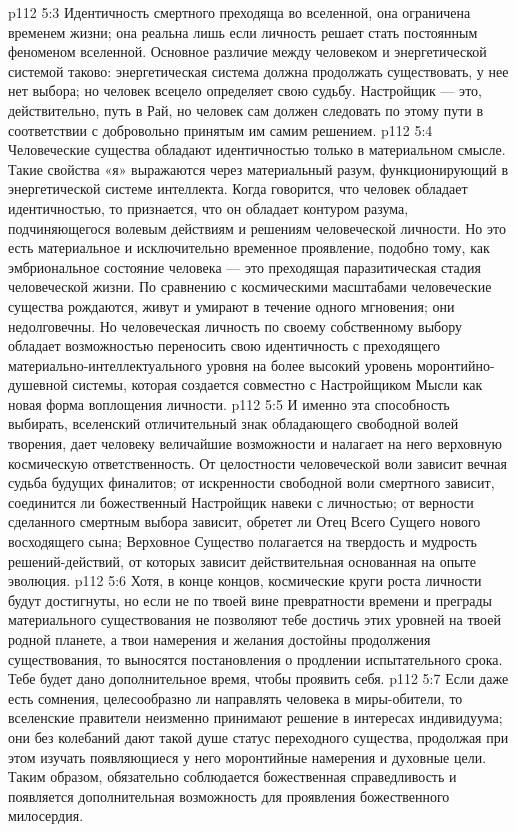 \vs p112 5:3 \pc Идентичность смертного преходяща во вселенной, она ограничена временем жизни; она реальна лишь если личность решает стать постоянным феноменом вселенной. Основное различие между человеком и энергетической системой таково: энергетическая система должна продолжать существовать, у нее нет выбора; но человек всецело определяет свою судьбу. Настройщик --- это, действительно, путь в Рай, но человек сам должен следовать по этому пути в соответствии с добровольно принятым им самим решением.
\vs p112 5:4 Человеческие существа обладают идентичностью только в материальном смысле. Такие свойства «я» выражаются через материальный разум, функционирующий в энергетической системе интеллекта. Когда говорится, что человек обладает идентичностью, то признается, что он обладает контуром разума, подчиняющегося волевым действиям и решениям человеческой личности. Но это есть материальное и исключительно временное проявление, подобно тому, как эмбриональное состояние человека --- это преходящая паразитическая стадия человеческой жизни. По сравнению с космическими масштабами человеческие существа рождаются, живут и умирают в течение одного мгновения; они недолговечны. Но человеческая личность по своему собственному выбору обладает возможностью переносить свою идентичность с преходящего материально\hyp{}интеллектуального уровня на более высокий уровень моронтийно\hyp{}душевной системы, которая создается совместно с Настройщиком Мысли как новая форма воплощения личности.
\vs p112 5:5 И именно эта способность выбирать, вселенский отличительный знак обладающего свободной волей творения, дает человеку величайшие возможности и налагает на него верховную космическую ответственность. От целостности человеческой воли зависит вечная судьба будущих финалитов; от искренности свободной воли смертного зависит, соединится ли божественный Настройщик навеки с личностью; от верности сделанного смертным выбора зависит, обретет ли Отец Всего Сущего нового восходящего сына; Верховное Существо полагается на твердость и мудрость решений\hyp{}действий, от которых зависит действительная основанная на опыте эволюция.
\vs p112 5:6 \pc Хотя, в конце концов, космические круги роста личности будут достигнуты, но если не по твоей вине превратности времени и преграды материального существования не позволяют тебе достичь этих уровней на твоей родной планете, а твои намерения и желания достойны продолжения существования, то выносятся постановления о продлении испытательного срока. Тебе будет дано дополнительное время, чтобы проявить себя.
\vs p112 5:7 Если даже есть сомнения, целесообразно ли направлять человека в миры\hyp{}обители, то вселенские правители неизменно принимают решение в интересах индивидуума; они без колебаний дают такой душе статус переходного существа, продолжая при этом изучать появляющиеся у него моронтийные намерения и духовные цели. Таким образом, обязательно соблюдается божественная справедливость и появляется дополнительная возможность для проявления божественного милосердия.
